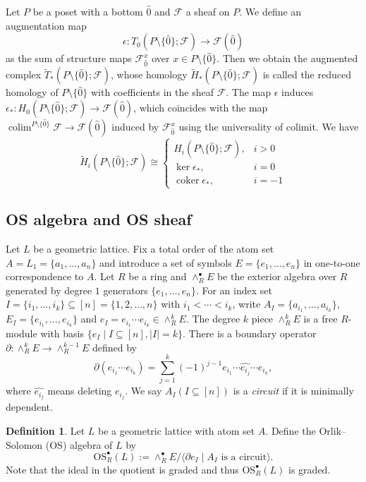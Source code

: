 \documentclass{amsart}
\numberwithin{equation}{section}
\theoremstyle{plain}
\theoremstyle{remark}
\theoremstyle{definition}
\newtheorem{defn}[thm]{Definition}
\numberwithin{equation}{section}
\newcommand{\FF}{\mathscr{F}}
\newcommand{\OS}{\mathrm{OS}}
\DeclareMathOperator{\colim}{colim}
\DeclareMathOperator{\coker}{coker}
\begin{document}
Let $P$ be a poset with a bottom $\hat{0}$ and $\FF$ a sheaf on $P$. We define an augmentation map 
\[
\epsilon: T_0(P\setminus\{\hat{0}\};\FF)\to\FF(\hat{0})
\]
as the sum of structure maps $\FF^x_{\hat{0}}$ over $x\in P\setminus\{\hat{0}\}$. Then we obtain the augmented complex $\widetilde{T}_*(P\setminus\{\hat{0}\};\FF)$, whose homology $\widetilde{H}_*(P\setminus\{\hat{0}\};\FF)$ is called the reduced homology of $P\setminus\{\hat{0}\}$ with coefficients in the sheaf $\FF$. The map $\epsilon$ induces $\epsilon_*: H_0(P\setminus\{\hat{0}\};\FF)\to \FF(\hat{0})$, which coincides with the map $\colim^{P\setminus\{\hat{0}\}}\FF\to\FF(\hat{0})$ induced by $\FF^x_{\hat{0}}$ using the universality of colimit. We have
\[
\widetilde{H}_i(P\setminus\{\hat{0}\};\FF)\cong \begin{cases}
    H_i(P\setminus\{\hat{0}\};\FF), & i>0\\
    \ker\epsilon_*, & i=0\\
    \coker\epsilon_*, & i=-1
\end{cases}
\]


\subsection{OS algebra and OS sheaf}

Let $L$ be a geometric lattice. Fix a total order of the atom set $A=L_1=\{a_1,\ldots,a_n\}$ and introduce a set of symbols $E=\{e_1,\ldots,e_n\}$ in one-to-one correspondence to $A$. 
Let $R$ be a ring and $\wedge^\bullet_RE$ be the exterior algebra over $R$ generated by degree $1$ generators $\{e_1,\ldots,e_n\}$. For an index set $I=\{i_1,\ldots,i_k\}\subseteq [n]=\{1,2,\ldots,n\}$ with $i_1<\cdots<i_k$, write $A_I=\{a_{i_1},\ldots,a_{i_k}\}$, $E_I=\{e_{i_1},\ldots,e_{i_k}\}$ and $e_I=e_{i_1}\cdots e_{i_k}\in \wedge^k_RE$.
The degree $k$ piece $\wedge_R^kE$ is a free $R$-module with basis $\{e_I\mid I\subseteq [n],|I|=k\}$. There is a boundary operator $\partial: \wedge^k_RE\to \wedge^{k-1}_RE$ defined by
\[
\partial(e_{i_1}\cdots e_{i_k})=\sum_{j=1}^k(-1)^{j-1}e_{i_1}\cdots \widehat{e_{i_j}}\cdots e_{i_k},
\]
where $\widehat{e_{i_j}}$ means deleting $e_{i_j}$. 
We say $A_I(I\subseteq [n])$ is a {\it circuit} if it is minimally dependent.
\begin{defn}
Let $L$ be a geometric lattice with atom set $A$. Define the Orlik--Solomon (OS) algebra of $L$ by
\[
\OS^\bullet_R(L):=\wedge^\bullet_RE/\langle \partial e_I\mid A_I \text{ is a circuit}\rangle.
\]
Note that the ideal in the quotient is graded and thus $\OS^\bullet_R(L)$ is graded.
\end{defn}
\end{document}
